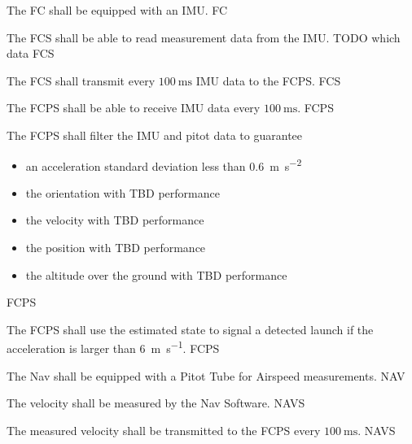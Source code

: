 
{
			The FC shall be equipped with an IMU.
		}
{   }
{FC}

{
			The FCS shall be able to read measurement data from the IMU. TODO which data
		}
{   }
{FCS}

{
			The FCS shall transmit every $\SI{100}{\milli\second}$ IMU data to the FCPS.
		}
{   }
{FCS}

{
			The FCPS shall be able to receive IMU data every $\SI{100}{\milli\second}$.
		}
{   }
{FCPS}

{
			The FCPS shall filter the IMU and pitot data to guarantee 
			\begin{itemize} 
				\item an acceleration standard deviation less than \SI{0.6}{\meter \per \second^2} 
				\item the orientation with TBD performance 
				\item the velocity with TBD performance 
				\item the position with TBD performance 
				\item the altitude over the ground with TBD performance 
			\end{itemize}
		}
{      }
{FCPS}

{
			The FCPS shall use the estimated state to signal a detected launch if the acceleration is larger 
			than \SI{6}{\meter \per \second}.
		}
{  }
{FCPS}

{
			The Nav shall be equipped with a Pitot Tube for Airspeed measurements.
		}
{  }
{NAV}

{
			The velocity shall be measured by the Nav Software.
		}
{  }
{NAVS}

{
			The measured velocity shall be transmitted to the FCPS every $\SI{100}{\milli \second}$.
		}
{  }
{NAVS}

